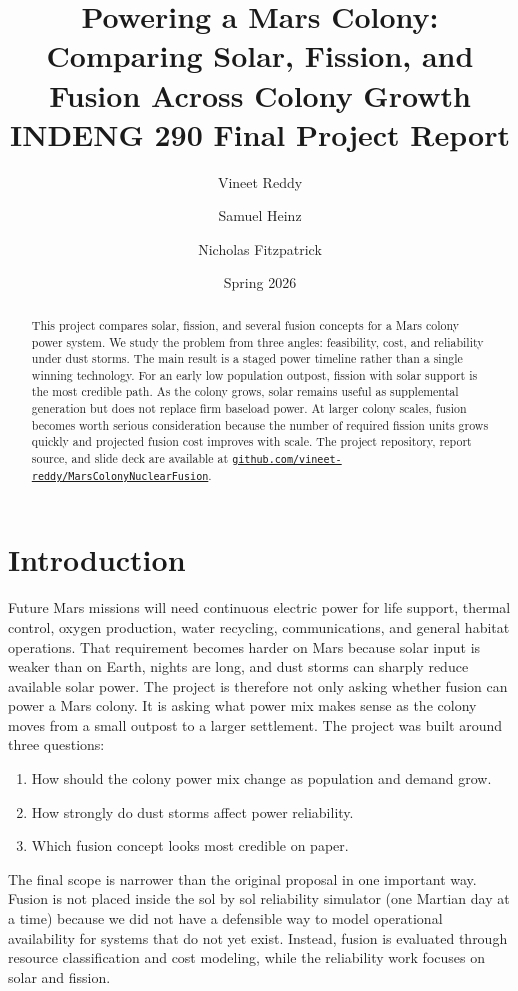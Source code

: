 \documentclass[11pt]{article}
\title{Powering a Mars Colony: Comparing Solar, Fission, and Fusion Across Colony Growth\\INDENG 290 Final Project Report}
\author{Vineet Reddy \and Samuel Heinz \and Nicholas Fitzpatrick}
\date{Spring 2026}
\begin{document}
\maketitle

\begin{abstract}
This project compares solar, fission, and several fusion concepts for a Mars colony power system. We study the problem from three angles: feasibility, cost, and reliability under dust storms. The main result is a staged power timeline rather than a single winning technology. For an early low population outpost, fission with solar support is the most credible path. As the colony grows, solar remains useful as supplemental generation but does not replace firm baseload power. At larger colony scales, fusion becomes worth serious consideration because the number of required fission units grows quickly and projected fusion cost improves with scale. The project repository, report source, and slide deck are available at \href{https://github.com/vineet-reddy/MarsColonyNuclearFusion}{\nolinkurl{github.com/vineet-reddy/MarsColonyNuclearFusion}}.
\end{abstract}

\section{Introduction}

Future Mars missions will need continuous electric power for life support, thermal control, oxygen production, water recycling, communications, and general habitat operations. That requirement becomes harder on Mars because solar input is weaker than on Earth, nights are long, and dust storms can sharply reduce available solar power. The project is therefore not only asking whether fusion can power a Mars colony. It is asking what power mix makes sense as the colony moves from a small outpost to a larger settlement. The project was built around three questions:

\begin{enumerate}
    \item How should the colony power mix change as population and demand grow.
    \item How strongly do dust storms affect power reliability.
    \item Which fusion concept looks most credible on paper.
\end{enumerate}

The final scope is narrower than the original proposal in one important way. Fusion is not placed inside the sol by sol reliability simulator (one Martian day at a time) because we did not have a defensible way to model operational availability for systems that do not yet exist. Instead, fusion is evaluated through resource classification and cost modeling, while the reliability work focuses on solar and fission.
\end{document}
